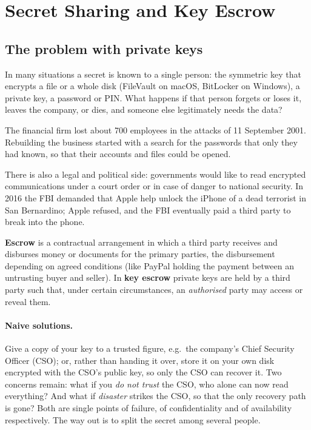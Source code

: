 \section{Secret Sharing and Key Escrow}
\label{sec:secret-sharing}

\subsection{The problem with private keys}

In many situations a secret is known to a single person: the symmetric key that encrypts a file or a whole disk (FileVault on macOS, BitLocker on Windows), a private key, a password or PIN. What happens if that person forgets or loses it, leaves the company, or dies, and someone else legitimately needs the data?

\begin{example}
The financial firm lost about 700 employees in the attacks of 11 September 2001. Rebuilding the business started with a search for the passwords that only they had known, so that their accounts and files could be opened.
\end{example}

There is also a legal and political side: governments would like to read encrypted communications under a court order or in case of danger to national security. In 2016 the FBI demanded that Apple help unlock the iPhone of a dead terrorist in San Bernardino; Apple refused, and the FBI eventually paid a third party to break into the phone.

\begin{definition}
\textbf{Escrow} is a contractual arrangement in which a third party receives and disburses money or documents for the primary parties, the disbursement depending on agreed conditions (like PayPal holding the payment between an untrusting buyer and seller). In \textbf{key escrow} private keys are held by a third party such that, under certain circumstances, an \emph{authorised} party may access or reveal them.
\end{definition}

\paragraph{Naive solutions.} Give a copy of your key to a trusted figure, e.g.\ the company's Chief Security Officer (CSO); or, rather than handing it over, store it on your own disk encrypted with the CSO's public key, so only the CSO can recover it. Two concerns remain: what if you \emph{do not trust} the CSO, who alone can now read everything? And what if \emph{disaster} strikes the CSO, so that the only recovery path is gone? Both are single points of failure, of confidentiality and of availability respectively. The way out is to split the secret among several people.

